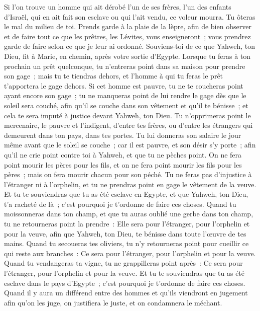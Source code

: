 \begin{multicols}{2}
Si l'on trouve un homme qui ait dérobé l'un de ses frères, l'un des enfants d'Israël, qui en ait fait son esclave ou qui l'ait vendu, ce voleur mourra. Tu ôteras le mal du milieu de toi.
Prends garde à la plaie de la lèpre, afin de bien observer et de faire tout ce que les prêtres, les Lévites, vous enseigneront~; vous prendrez garde de faire selon ce que je leur ai ordonné.
Souviens-toi de ce que Yahweh, ton Dieu, fit à Marie, en chemin, après votre sortie d'Egypte.
Lorsque tu feras à ton prochain un prêt quelconque, tu n'entreras point dans sa maison pour prendre son gage~;
mais tu te tiendras dehors, et l'homme à qui tu feras le prêt t'apportera le gage dehors.
Si cet homme est pauvre, tu ne te coucheras point ayant encore son gage~;
tu ne manqueras point de lui rendre le gage dès que le soleil sera couché, afin qu'il se couche dans son vêtement et qu'il te bénisse~; et cela te sera imputé à justice devant Yahweh, ton Dieu.
Tu n'opprimeras point le mercenaire, le pauvre et l'indigent, d'entre tes frères, ou d'entre les étrangers qui demeurent dans ton pays, dans tes portes.
Tu lui donneras son salaire le jour même avant que le soleil se couche~; car il est pauvre, et son désir s'y porte~; afin qu'il ne crie point contre toi à Yahweh, et que tu ne pèches point.
On ne fera point mourir les pères pour les fils, et on ne fera point mourir les fils pour les pères~; mais on fera mourir chacun pour son péché.
Tu ne feras pas d'injustice à l'étranger ni à l'orphelin, et tu ne prendras point en gage le vêtement de la veuve.
Et tu te souviendras que tu as été esclave en Egypte, et que Yahweh, ton Dieu, t'a racheté de là~; c'est pourquoi je t'ordonne de faire ces choses.
Quand tu moissonneras dans ton champ, et que tu auras oublié une gerbe dans ton champ, tu ne retourneras point la prendre~: Elle sera pour l'étranger, pour l'orphelin et pour la veuve, afin que Yahweh, ton Dieu, te bénisse dans toute l'œuvre de tes mains.
Quand tu secoueras tes oliviers, tu n'y retourneras point pour cueillir ce qui reste aux branches~: Ce sera pour l'étranger, pour l'orphelin et pour la veuve.
Quand tu vendangeras ta vigne, tu ne grappilleras point après~: Ce sera pour l'étranger, pour l'orphelin et pour la veuve.
Et tu te souviendras que tu as été esclave dans le pays d'Egypte~; c'est pourquoi je t'ordonne de faire ces choses.
\VerseOne{}Quand il y aura un différend entre des hommes et qu'ils viendront en jugement afin qu'on les juge, on justifiera le juste, et on condamnera le méchant.

\end{multicols}
